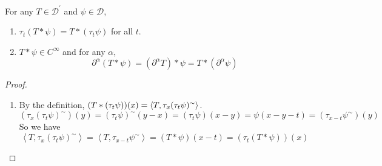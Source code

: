 \begin{enumerate}[label=\arabic*.]
	\begin{prop}\label{prop:convofdistri}
		For any $T \in \mathcal{D}^\prime$ and $\psi \in \mathcal{D}$,
		\begin{enumerate}[label=(\arabic{*})]
			\item $\tau_t(T*\psi) = T*(\tau_t\psi)$ for all $t$.
			\item $T * \psi \in C^\infty$ and for any $\alpha$,
			\begin{equation*}
				\partial^\alpha(T*\psi) = (\partial^\alpha T) * \psi = T * (\partial^\alpha \psi)
			\end{equation*}
		\end{enumerate}
	\end{prop}
	\begin{proof}
		\begin{enumerate}[label=(\arabic{*})]
			\item By the definition, $(T * (\tau_t\psi))(x) = \langle T, \tau_x(\tau_t\psi)^\sim \rangle$.
			\begin{equation*}
				\left(\tau_x\left(\tau_t \psi\right)^{\sim}\right)(y)=\left(\tau_t \psi\right)^{\sim}(y-x)=\left(\tau_t \psi\right)(x-y)=\psi(x-y-t)=\left(\tau_{x-t} \psi^{\sim}\right)(y)
			\end{equation*}
			So we have
			\begin{equation*}
				\left\langle T, \tau_x\left(\tau_t \psi\right)^{\sim}\right\rangle=\left\langle T, \tau_{x-t} \psi^{\sim}\right\rangle=(T * \psi)(x-t)=\left(\tau_t(T * \psi)\right)(x)
			\end{equation*}


\end{enumerate}
\end{proof}
\end{enumerate}
